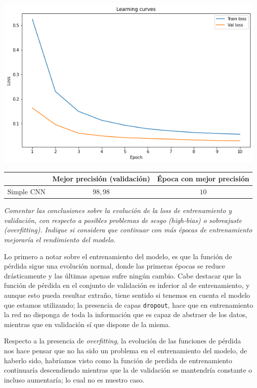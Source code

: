 \documentclass[11pt]{article}
\begin{document}
\begin{enumerate}
        \begin{center}
            \includegraphics[scale = 0.5]{imgs/mnist_loss_curve.png}
        \end{center}
        \begin{table}[H]
            \centering
            \begin{tabular}{c|cc}
                            & \textbf{Mejor precisión (validación)} & \textbf{Época con mejor precisión} \\ \hline
                 Simple CNN &     \( 98,98 \)       &      \( 10 \)       \\
            \end{tabular}
        \end{table}
        \emph{Comentar las conclusiones sobre la evolución de la loss de entrenamiento y validación, con respecto a posibles problemas de sesgo (high-bias) o sobreajuste (overfitting). Indique si considera que continuar con más épocas de entrenamiento mejoraría el rendimiento del modelo}.

        Lo primero a notar sobre el entrenamiento del modelo, es que la función de pérdida sigue una evolución normal, donde las primeras épocas se reduce drásticamente y las últimas apenas sufre ningún cambio. Cabe destacar que la función de pérdida en el conjunto de validación es inferior al de entrenamiento, y aunque esto pueda resultar extraño, tiene sentido si tenemos en cuenta el modelo que estamos utilizando; la presencia de capas \texttt{dropout}, hace que en entrenamiento la red no disponga de toda la información que es capaz de abstraer de los datos, mientras que en validación sí que dispone de la misma.

        Respecto a la presencia de \emph{overfitting}, la evolución de las funciones de pérdida nos hace pensar que no ha sido un problema en el entrenamiento del modelo, de haberlo sido, habríamos visto como la función de perdida de entrenamiento continuaría descendiendo mientras que la de validación se mantendría constante o incluso aumentaría; lo cual no es nuestro caso.


\end{enumerate}
\end{document}
